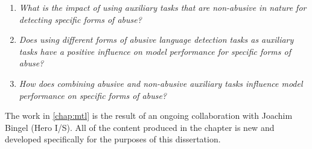 \begin{center}
\begin{minipage}{0.9\textwidth}
\vspace{5mm}
    \begin{enumerate}[start=6, label={\textbf{RQ \arabic*}}]
        \item{\textit{What is the impact of using auxiliary tasks that are non-abusive in nature for detecting specific forms of abuse?}}
        \item{\textit{Does using different forms of abusive language detection tasks as auxiliary tasks have a positive influence on model performance for specific forms of abuse?}}
        \item{\textit{How does combining abusive and non-abusive auxiliary tasks influence model performance on specific forms of abuse?}}
    \end{enumerate}
    \vspace{5mm}
\end{minipage}
\end{center}

The work in \cref{chap:mtl} is the result of an ongoing collaboration with Joachim Bingel (Hero I/S).
All of the content produced in the chapter is new and developed specifically for the purposes of this dissertation.

